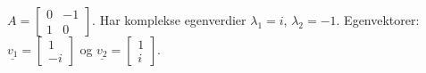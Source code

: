 \documentclass[11pt, a4paper, norsk]{article}
\begin{document}
        
        \begin{Example}{}{}
            $A = \begin{bmatrix}
                0 & -1 \\
                1 & 0
            \end{bmatrix}$. Har komplekse egenverdier $\lambda_1 = i$, $\lambda_2 = -1$. Egenvektorer: $\underline{v_1} = \begin{bmatrix}
                1 \\
                -i
            \end{bmatrix}$ og $\underline{v_2} = \begin{bmatrix}
                1 \\
                i
            \end{bmatrix}$. 


\end{Example}
\end{document}

